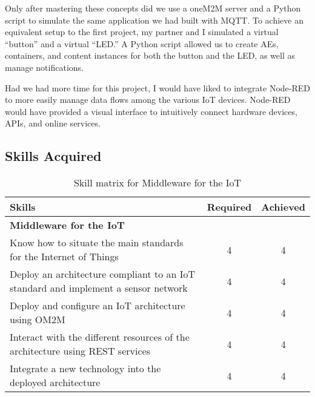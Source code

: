 Only after mastering these concepts did we use a oneM2M server and a Python script to simulate the same application we had built with MQTT. To achieve an equivalent setup to the first project, my partner and I simulated a virtual “button” and a virtual “LED.” A Python script allowed us to create AEs, containers, and content instances for both the button and the LED, as well as manage notifications. 

Had we had more time for this project, I would have liked to integrate Node-RED to more easily manage data flows among the various IoT devices. Node-RED would have provided a visual interface to intuitively connect hardware devices, APIs, and online services.

\subsection{Skills Acquired}

\begin{table}[h!]
    \centering
    \renewcommand{\arraystretch}{1.5} %
    \begin{tabular}{|p{11cm}|c|c|}
    \hline
    \rowcolor[gray]{0.8}
    \textbf{Skills} & \textbf{Required} & \textbf{Achieved} \\ \hline
    \rowcolor[gray]{0.9} \textbf{Middleware for the IoT} &  &  \\ \hline
    Know how to situate the main standards for the Internet of Things & 4 & 4 \\ \hline
    Deploy an architecture compliant to an IoT standard and implement a sensor network & 4 & 4 \\ \hline
    Deploy and configure an IoT architecture using OM2M & 4 & 4 \\ \hline
    Interact with the different resources of the architecture using REST services & 4 & 4 \\ \hline
    Integrate a new technology into the deployed architecture & 4 & 4 \\ \hline
    \end{tabular}
    \caption{Skill matrix for Middleware for the IoT}
    \label{table:skills-middleware-iot}
\end{table}

